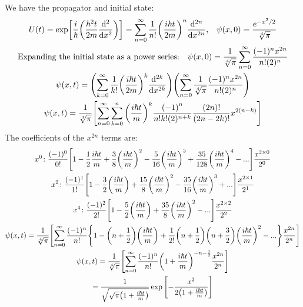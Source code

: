\documentclass{report}
\theoremstyle{definition}
\begin{document}
\begin{chapter5}\label{prob: 3}
	We have the propagator and initial state:
		\begin{gather*}
			U(t) = \exp[\frac{i}{\hbar}\pqty{\frac{\hbar^2 t}{2m}\dv[2]{x}}] = \sum_{n=0}^{\infty} \frac{1}{n!}\pqty{\frac{i\hbar t}{2m}}^n \dv[2n]{x}, \;\;\; \psi(x,0) = \frac{e^{-x^2/2}}{\sqrt[4]\pi} \\
			\qq*{Expanding the initial state as a power series:}\psi(x,0) = \frac{1}{\sqrt[4]\pi} \sum_{n=0}^{\infty} \frac{(-1)^n x^{2n}}{n!(2)^n} \\
			\psi(x,t) = \pqty{\sum_{k=0}^{\infty} \frac{1}{k!}\pqty{\frac{i\hbar t}{2m}}^k \dv[2k]{x}}\pqty{\sum_{n=0}^{\infty}\frac{1}{\sqrt[4]\pi}\frac{(-1)^n x^{2n}}{n!(2)^n}} \\
			\psi(x,t) = \frac{1}{\sqrt[4]\pi}\bqty{\sum_{n=0}^{\infty}\sum_{k=0}^{n}\pqty{\frac{i\hbar t}{m}}^k\frac{\pqty{-1}^n}{n!k! (2)^{n+k}}\frac{\pqty{2n}!}{\pqty{2n-2k}!}x^{2(n-k)}}
		\end{gather*}
		The coefficients of the $x^{2n}$ terms are:
		\begin{gather*}
			x^0\colon \frac{(-1)^0}{0!}\bqty{1 - \frac{1}{2}\frac{i\hbar t}{m} + \frac{3}{8}\pqty{\frac{i \hbar t}{m}}^2 - \frac{5}{16}\pqty{\frac{i \hbar t}{m}}^3 + \frac{35}{128}\pqty{\frac{i \hbar t}{m}}^4 - ...}\frac{x^{2\times 0}}{2^0} \\
			x^2\colon \frac{(-1)^1}{1!}\bqty{1 - \frac{3}{2}\pqty{\frac{i \hbar t}{m}} + \frac{15}{8}\pqty{\frac{i \hbar t}{m}}^2 - \frac{35}{16}\pqty{\frac{i \hbar t}{m}}^3 + ...}\frac{x^{2 \times 1}}{2^1} \\
			x^4\colon \frac{(-1)^2}{2!}\bqty{1-\frac{5}{2}\pqty{\frac{i \hbar t}{m}} + \frac{35}{8}\pqty{\frac{i \hbar t}{m}}^2 - ...}\frac{x^{2 \times 2}}{2^2} \\
			\psi(x,t) = \frac{1}{\sqrt[4]{\pi}} \bqty{\sum_{n = 0}^{\infty} \frac{(-1)^n}{n!}\Bqty{1 - \pqty{n + \frac{1}{2}}\pqty{\frac{i \hbar t}{m}} + \frac{1}{2!}\pqty{n + \frac{1}{2}}\pqty{n + \frac{3}{2}}\pqty{\frac{i \hbar t}{m}}^2 - ...}\frac{x^{2n}}{2^n}} \\
			\psi(x,t) = \frac{1}{\sqrt[4]\pi} \bqty{\sum_{n = 0}^{\infty} \frac{(-1)^n}{n!}\pqty{1 + \frac{i \hbar t}{m}}^{-n-\frac{1}{2}} \frac{x^{2n}}{2^n}} \\ = \frac{1}{\sqrt{\sqrt{\pi}\pqty{1 + \frac{i \hbar t}{m}}}} \exp\bqty{-\frac{x^2}{2\pqty{1 + \frac{i \hbar t}{m}}}}
		\end{gather*}
\end{chapter5}

\begin{chapter5}\label{prob: 4}
	
\end{chapter5}
\end{document}
